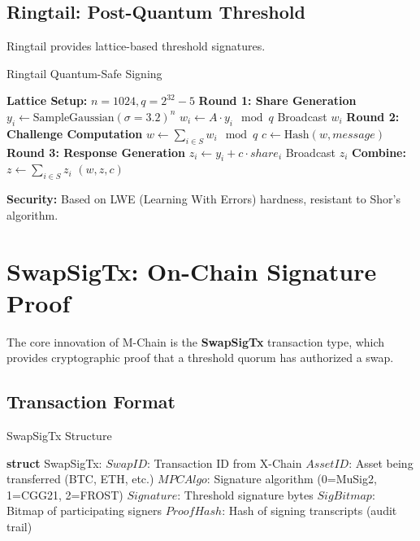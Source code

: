 \documentclass[11pt]{article}
\begin{document}
\subsection{Ringtail: Post-Quantum Threshold}

Ringtail \cite{ntt-ringtail} provides lattice-based threshold signatures.

\begin{algorithm}[H]
\caption{Ringtail Quantum-Safe Signing}
\begin{algorithmic}[1]
    \State \textbf{Lattice Setup:} $n = 1024, q = 2^{32} - 5$
    \State
    \State \textbf{Round 1: Share Generation}
        \State $y_i \gets \text{SampleGaussian}(\sigma = 3.2)^n$
        \State $w_i \gets A \cdot y_i \mod q$ 
        \State Broadcast $w_i$
    \EndFor
    \State
    \State \textbf{Round 2: Challenge Computation}
    \State $w \gets \sum_{i \in S} w_i \mod q$
    \State $c \gets \text{Hash}(w, message)$ 
    \State
    \State \textbf{Round 3: Response Generation}
        \State $z_i \gets y_i + c \cdot share_i$
        \State Broadcast $z_i$
    \EndFor
    \State
    \State \textbf{Combine:}
    \State $z \gets \sum_{i \in S} z_i$
    \State \Return $(w, z, c)$ 
\EndFunction
\end{algorithmic}
\end{algorithm}

\textbf{Security:} Based on LWE (Learning With Errors) hardness, resistant to Shor's algorithm.

\section{SwapSigTx: On-Chain Signature Proof}

The core innovation of M-Chain is the \textbf{SwapSigTx} transaction type, which provides cryptographic proof that a threshold quorum has authorized a swap.

\subsection{Transaction Format}

\begin{algorithm}[H]
\caption{SwapSigTx Structure}
\begin{algorithmic}[1]
\State \textbf{struct} SwapSigTx:
\State \quad $SwapID$: Transaction ID from X-Chain
\State \quad $AssetID$: Asset being transferred (BTC, ETH, etc.)
\State \quad $MPCAlgo$: Signature algorithm (0=MuSig2, 1=CGG21, 2=FROST)
\State \quad $Signature$: Threshold signature bytes
\State \quad $SigBitmap$: Bitmap of participating signers
\State \quad $ProofHash$: Hash of signing transcripts (audit trail)
\end{algorithmic}
\end{algorithm}
\end{document}
